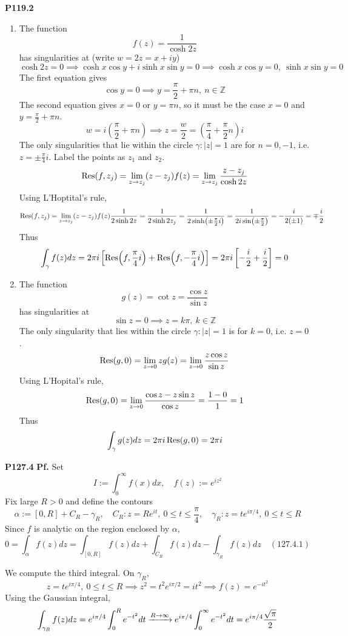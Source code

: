 \documentclass{article}
\def\mbb#1{\mathbb{#1}}
\def\tbf#1{\textbf{#1}}
\def\bZ{\mbb{Z}}
\newcommand{\br}[1]{\left(#1\right)}
\newcommand{\sbr}[1]{\left[#1\right]}
\newcommand{\pf}{\tbf{Pf. }}
\newcommand{\imp}{\implies}
\newcommand{\sep}[1][.5cm]{\vspace{#1}}
\begin{document}
\tbf{P119.2} 

\begin{enumerate}[label=(\roman*)]
	
\item The function
$$f(z) = \frac{1}{\cosh2z}$$
has singularities at (write $w=2z=x+iy$)
$$\cosh2z = 0
\imp \cosh x\cos y+i\sinh x\sin y = 0
\imp \cosh x\cos y = 0,~\sinh x\sin y = 0$$
The first equation gives
$$\cos y = 0
\imp y = \frac\pi2+ \pi n,~n\in\bZ$$
The second equation gives $x=0$ or $y=\pi n$, so it must be the case $x=0$ and $y=\frac\pi2+\pi n$.
$$w = i\br{\frac\pi2+\pi n}
\imp z = \frac w2 = \br{\frac\pi4+\frac\pi2n}i$$
The only singularities that lie within the circle $\gamma:|z|=1$ are for $n=0,-1$, i.e. $z=\pm\frac\pi4i$. Label the points as $z_1$ and $z_2$.
$$\Res(f,z_j) = \lim_{z\to z_j}(z-z_j)f(z)
= \lim_{z\to z_j}\frac{z-z_j}{\cosh2z}$$
Using L'Hoptital's rule,
$$\Res(f,z_j) = \lim_{z\to z_j}(z-z_j)f(z)\frac{1}{2\sinh2z}
= \frac{1}{2\sinh2z_j}
= \frac{1}{2\sinh(\pm\frac\pi2i)}
= \frac{1}{2i\sin(\pm\frac\pi2)}
= -\frac{i}{2(\pm 1)}
= \mp\frac i2$$
Thus
$$\int_\gamma f(z)dz = 2\pi i\sbr{\Res(f,\frac\pi4i) + \Res(f,-\frac\pi4i)}
= 2\pi i\sbr{-\frac i2+\frac i2}
= 0$$


\item The function
$$g(z) = \cot z = \frac{\cos z}{\sin z}$$
has singularities at
$$\sin z = 0
\imp z = k\pi,~k\in\bZ$$
The only singularity that lies within the circle $\gamma:|z|=1$ is for $k=0$, i.e. $z=0$.
$$\Res(g,0) = \lim_{z\to 0}zg(z)
= \lim_{z\to 0}\frac{z\cos z}{\sin z}$$
Using L'Hopital's rule,
$$\Res(g,0) = \lim_{z\to 0}\frac{\cos z-z\sin z}{\cos z}
= \frac{1 - 0}{1}
= 1$$
Thus
$$\int_\gamma g(z)dz = 2\pi i\Res(g,0) = 2\pi i$$

\end{enumerate}
\sep



\tbf{P127.4} \pf Set
$$I := \int_0^\infty f(x)dx,
\quad f(z) := e^{iz^2}$$
Fix large $R>0$ and define the contours
$$\alpha := [0,R] + C_R - \gamma_R,
\quad C_R: z = Re^{it},~ 0\le t\le \frac\pi4,
\quad \gamma_R: z = te^{i\pi/4},~ 0\le t\le R$$
Since $f$ is analytic on the region enclosed by $\alpha$,
$$0 = \int_\alpha f(z)dz = \int_{[0,R]}f(z)dz + \int_{C_R}f(z)dz - \int_{\gamma_R}f(z)dz \quad (127.4.1)$$

We compute the third integral. On $\gamma_R$,
$$z = te^{i\pi/4},~0\le t\le R
\imp z^2 = t^2e^{i\pi/2} = it^2
\imp f(z) = e^{-it^2}$$
Using the Gaussian integral,
$$\int_{\gamma_R}f(z)dz = e^{i\pi/4}\int_0^R e^{-t^2}dt
\app[R][\infty] e^{i\pi/4}\int_0^\infty e^{-t^2}dt
= e^{i\pi/4}\frac{\sqrt\pi}{2}$$
\end{document}
